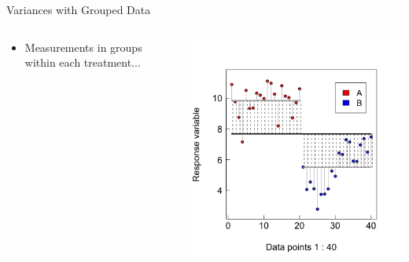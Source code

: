 \documentclass{beamer}
\begin{document}
\begin{frame}{Variances with Grouped Data}
  \begin{columns}[onlytextwidth] %
    \begin{column}{0.54\textwidth}
  \begin{itemize}
    \item Measurements in groups within each treatment...
  \end{itemize}    \end{column}
    \hspace{0.02\textwidth} %
    \begin{column}{0.46\textwidth}
      \begin{center}
        \includegraphics[width=0.999\textwidth]{lectures/day_1_intro_to_mems/figures/unnamed-chunk-23-1.png}
      \end{center}
    \end{column}
  \end{columns}
\end{frame}
\end{document}
